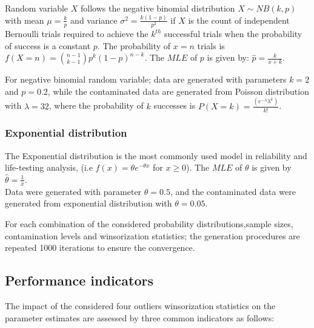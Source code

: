 \documentclass[
]{article}
\begin{document}
Random variable \(X\) follows the negative binomial distribution
\(X \sim NB(k,p)\) with mean \(\mu =\frac{k}{p}\) and variance
\(\sigma^2= \frac{k(1-p)}{p^2}\) if \(X\) is the count of independent
Bernoulli trials required to achieve the \(k^{th}\) successful trials
when the probability of success is a constant \(p\). The probability of
\(x=n\) trials is \(f(X=n)= {n-1 \choose k-1} p^k (1-p)^{n-k}\). The
\(MLE\) of \(p\) is given by: \(\hat{p} = \frac{k}{x + k}\).

For negative binomial random variable; data are generated with
parameters \(k=2\) and \(p=0.2\), while the contaminated data are
generated from Poisson distribution with \(\lambda = 32\), where the
probability of \(k\) successes is
\(P(X=k) = \frac {(e^{-\lambda} \lambda^k)} {k!}\).

\hypertarget{exponential-distribution}{%
\subsubsection{Exponential
distribution}\label{exponential-distribution}}

The Exponential distribution is the most commonly used model in
reliability and life-testing analysis, (i.e
\(f(x)=\theta e^{-\theta x}\) for \(x \geq 0\)). The \(MLE\) of
\(\theta\) is given by \(\hat{\theta}= \frac{1}{\bar{x}}\).\\
Data were generated with parameter \(\theta = 0.5\), and the
contaminated data were generated from exponential distribution with
\(\theta = 0.05\).

For each combination of the considered probability distributions,sample
sizes, contamination levels and winsorization statistics; the generation
procedures are repeated 1000 iterations to ensure the convergence.

\hypertarget{performance-indicators}{%
\subsection{Performance indicators}\label{performance-indicators}}

The impact of the considered four outliers winsorization statistics on
the parameter estimates are assessed by three common indicators as
follows:
\end{document}
